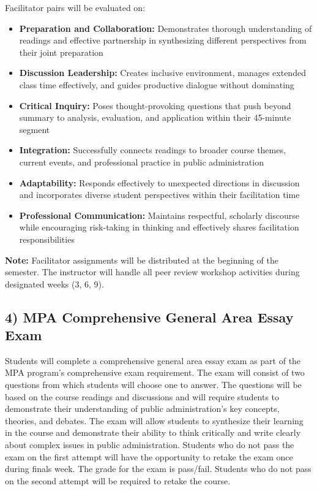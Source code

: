 \documentclass[12pt]{article}     %
\begin{document}
Facilitator pairs will be evaluated on:
\begin{itemize}
    \item \textbf{Preparation and Collaboration:} Demonstrates thorough understanding of readings and effective partnership in synthesizing different perspectives from their joint preparation
    \item \textbf{Discussion Leadership:} Creates inclusive environment, manages extended class time effectively, and guides productive dialogue without dominating
    \item \textbf{Critical Inquiry:} Poses thought-provoking questions that push beyond summary to analysis, evaluation, and application within their 45-minute segment
    \item \textbf{Integration:} Successfully connects readings to broader course themes, current events, and professional practice in public administration
    \item \textbf{Adaptability:} Responds effectively to unexpected directions in discussion and incorporates diverse student perspectives within their facilitation time
    \item \textbf{Professional Communication:} Maintains respectful, scholarly discourse while encouraging risk-taking in thinking and effectively shares facilitation responsibilities
\end{itemize}

\textbf{Note:} Facilitator assignments will be distributed at the beginning of the semester. The instructor will handle all peer review workshop activities during designated weeks (3, 6, 9).

\subsection*{4) MPA Comprehensive General Area Essay Exam}

Students will complete a comprehensive general area essay exam as part of the MPA program's comprehensive exam requirement. The exam will consist of two questions from which students will choose one to answer. The questions will be based on the course readings and discussions and will require students to demonstrate their understanding of public administration's key concepts, theories, and debates. The exam will allow students to synthesize their learning in the course and demonstrate their ability to think critically and write clearly about complex issues in public administration. Students who do not pass the exam on the first attempt will have the opportunity to retake the exam once during finals week. The grade for the exam is pass/fail. Students who do not pass on the second attempt will be required to retake the course.
\end{document}
